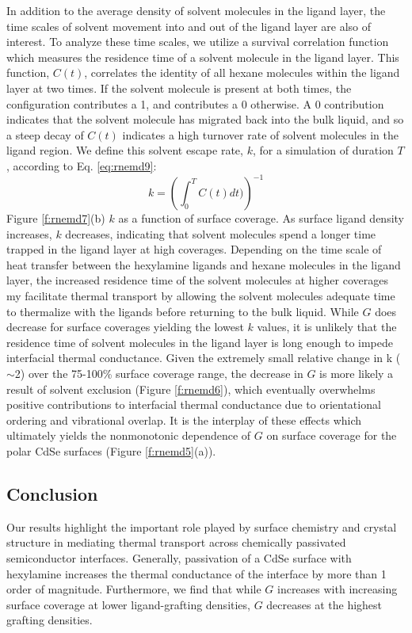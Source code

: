 In addition to the average density of solvent molecules in the ligand layer, the time scales of solvent movement into and out of the ligand layer are also of interest. To analyze these time scales, we utilize a survival correlation function which measures the residence time of a solvent molecule in the ligand layer. This function, $C(t)$, correlates the identity of all hexane molecules within the ligand layer at two times. If the solvent molecule is present at both times, the configuration contributes a 1, and contributes a 0 otherwise. A 0 contribution indicates that the solvent molecule has migrated back into the bulk liquid, and so a steep decay of $C(t)$ indicates a high turnover rate of solvent molecules in the ligand region. We define this solvent escape rate, $k$, for a simulation of duration $T$, according to Eq. \ref{eq:rnemd9}: 
\begin{equation} \label{eq:rnemd9}
k = \left(\int^T_0 C(t)dt)\right)^{-1}
\end{equation}
Figure \ref{f:rnemd7}(b) $k$ as a function of surface coverage. As surface ligand density increases, $k$ decreases, indicating that solvent molecules spend a longer time trapped in the ligand layer at high coverages. Depending on the time scale of heat transfer between the hexylamine ligands and hexane molecules in the ligand layer, the increased residence time of the solvent molecules at higher coverages my facilitate thermal transport by allowing the solvent molecules adequate time to thermalize with the ligands before returning to the bulk liquid. While $G$ does decrease for surface coverages yielding the lowest $k$ values, it is unlikely that the residence time of solvent molecules in the ligand layer is long enough to impede interfacial thermal conductance. Given the extremely small relative change in k ($\sim$2) over the 75-100\% surface coverage range, the decrease in $G$ is more likely a result of solvent exclusion (Figure \ref{f:rnemd6}), which eventually overwhelms positive contributions to interfacial thermal conductance due to orientational ordering and vibrational overlap. It is the interplay of these effects which ultimately yields the nonmonotonic dependence of $G$ on surface coverage for the polar CdSe surfaces (Figure \ref{f:rnemd5}(a)).

\subsection{Conclusion}
Our results highlight the important role played by surface chemistry and crystal structure in mediating thermal transport across chemically passivated semiconductor interfaces. Generally, passivation of a CdSe surface with hexylamine increases the thermal conductance of the interface by more than 1 order of magnitude. Furthermore, we find that while $G$ increases with increasing surface coverage at lower ligand-grafting densities, $G$ decreases at the highest grafting densities. \par

